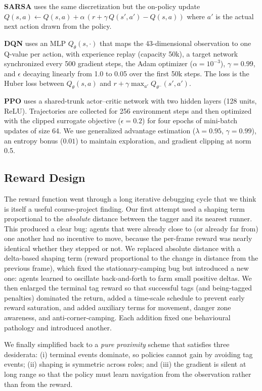 \documentclass[conference]{IEEEtran}
\begin{document}
\textbf{SARSA} uses the same discretization but the on-policy update
$Q(s,a) \leftarrow Q(s,a) + \alpha\,(r + \gamma\,Q(s', a') - Q(s,a))$ where
$a'$ is the actual next action drawn from the policy.

\textbf{DQN} uses an MLP $Q_\theta(s, \cdot)$ that maps the 43-dimensional
observation to one Q-value per action, with experience replay (capacity 50k),
a target network synchronized every 500 gradient steps, the Adam optimizer
($\alpha=10^{-3}$), $\gamma=0.99$, and $\epsilon$ decaying linearly from
1.0 to 0.05 over the first 50k steps. The loss is the Huber loss between
$Q_\theta(s,a)$ and $r + \gamma \max_{a'} Q_{\theta^-}(s', a')$.

\textbf{PPO} uses a shared-trunk actor--critic network with two hidden layers
(128 units, ReLU). Trajectories are collected for 256 environment steps and
then optimized with the clipped surrogate objective ($\epsilon=0.2$) for four
epochs of mini-batch updates of size 64. We use generalized advantage
estimation ($\lambda=0.95$, $\gamma=0.99$), an entropy bonus ($0.01$) to
maintain exploration, and gradient clipping at norm 0.5.

\subsection{Reward Design}\label{sec:reward}

The reward function went through a long iterative debugging cycle that we
think is itself a useful course-project finding. Our first attempt used a
shaping term proportional to the \emph{absolute} distance between the
tagger and its nearest runner. This produced a clear bug: agents that were
already close to (or already far from) one another had no incentive to
move, because the per-frame reward was nearly identical whether they
stepped or not. We replaced absolute distance with a delta-based shaping
term (reward proportional to the change in distance from the previous
frame), which fixed the stationary-camping bug but introduced a new one:
agents learned to oscillate back-and-forth to farm small positive deltas.
We then enlarged the terminal tag reward so that successful tags (and
being-tagged penalties) dominated the return, added a time-scale schedule
to prevent early reward saturation, and added auxiliary terms for movement,
danger zone awareness, and anti-corner-camping. Each addition fixed one
behavioural pathology and introduced another.

We finally simplified back to a \emph{pure proximity} scheme that
satisfies three desiderata: (i) terminal events dominate, so policies
cannot gain by avoiding tag events; (ii) shaping is symmetric across
roles; and (iii) the gradient is silent at long range so that the policy
must learn navigation from the observation rather than from the reward.
\end{document}
